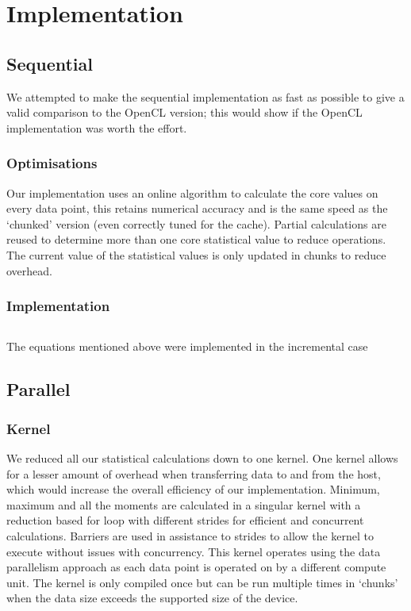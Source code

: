 
\section{Implementation}

\subsection{Sequential} 
We attempted to make the sequential implementation as fast as possible to give a valid comparison to the OpenCL version; this would show if the OpenCL implementation was worth the effort.

\subsubsection{Optimisations}
Our implementation uses an online algorithm to calculate the core values on every data point, this retains numerical accuracy and is the same speed as the `chunked' version (even correctly tuned for the cache). Partial calculations are reused to determine more than one core statistical value to reduce operations. The current value of the statistical values is only updated in chunks to reduce overhead.

\subsubsection{Implementation}
\begin{listing}[H]
\inputminted{python}{sequential.py}
\caption{The equations mentioned above were implemented in the incremental case}
\label{sequential:3}
\end{listing}

\subsection{Parallel}
\subsubsection{Kernel}
We reduced all our statistical calculations down to one kernel. One kernel allows for a lesser amount of overhead when transferring data to and from the host, which would increase the overall efficiency of our implementation. Minimum, maximum and all the moments are calculated in a singular kernel with a reduction based for loop with different strides for efficient and concurrent calculations. Barriers are used in assistance to strides to allow the kernel to execute without issues with concurrency. This kernel operates using the data parallelism approach as each data point is operated on by a different compute unit. The kernel is only compiled once but can be run multiple times in `chunks' when the data size exceeds the supported size of the device.

